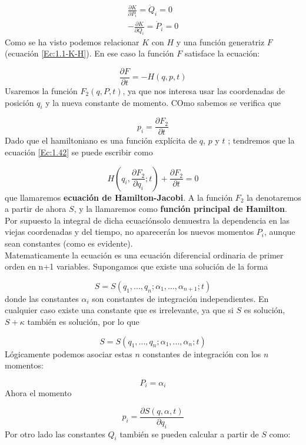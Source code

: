 \documentclass[12pt,a4paper]{article}
\numberwithin{equation}{section}
\numberwithin{figure}{section}
\newcommand{\parentesis}[1]{\left( #1  \right)}
\newcommand{\parciales}[2]{\frac{\partial #1}{\partial #2}}
\begin{document}
\begin{eqnarray}
\parciales{K}{P_i}  = \dot{Q}_i = 0 \\
- \parciales{K}{Q_i}  =  \dot{P}_i = 0
\end{eqnarray}
Como se ha visto podemos relacionar $K$ con $H$ y una función generatriz $F$ (ecuación \ref{Ec:1.1-K-H}). En ese caso la función $F$ satisface la ecuación:

\begin{equation}
\parciales{F}{t} = - H (q,p,t) \label{Ec:1.42}
\end{equation}
Usaremos la función $F_2(q,P,t)$, ya que nos interesa usar las coordenadas de posición $q_i$ y la nueva constante de momento. COmo sabemos se verifica que

$$ p_i = \parciales{F_2}{t} $$
Dado que el hamiltoniano es una función explícita de $q$, $p$ y $t$ ; tendremos que la ecuación \ref{Ec:1.42} se puede escribir como 

\begin{equation}
H \parentesis{q_i, \parciales{F_2}{q_i};t} + \parciales{F_2}{t} = 0
\end{equation}
que llamaremos \textbf{ecuación de Hamilton-Jacobi}. A la función $F_2$ la denotaremos a partir de ahora $S$, y la llamaremos como \textbf{función principal de Hamilton}. Por supuesto la integral de dicha ecuaciónsolo demuestra la dependencia en las  viejas coordenadas y del tiempo, no aparecerán los nuevos momentos $P_i$, aunque sean constantes (como es evidente). \\

Matematicamente la ecuación es una ecuación diferencial ordinaria de primer orden en n+1 variables. Supongamos que existe una solución de la forma

$$ S = S(q_1,...,q_n;\alpha_1,...,\alpha_{n+1};t) $$
donde las constantes $\alpha_i$ son constantes de integración independientes. En cualquier caso existe una constante que es irrelevante, ya que si $S$ es solución, $S+\kappa$ también es solución, por lo que 

\begin{equation}
 S = S(q_1,...,q_n;\alpha_1,...,\alpha_{n};t) 
\end{equation}
Lógicamente podemos asociar estas $n$ constantes de integración con los $n$ momentos:

\begin{equation}
P_i = \alpha_i
\end{equation}
Ahora el momento

\begin{equation}
p_i = \parciales{S(q,\alpha,t)}{q_i}
\end{equation}
Por otro lado las constantes $Q_i$ también se pueden calcular a partir de $S$ como:
\end{document}
